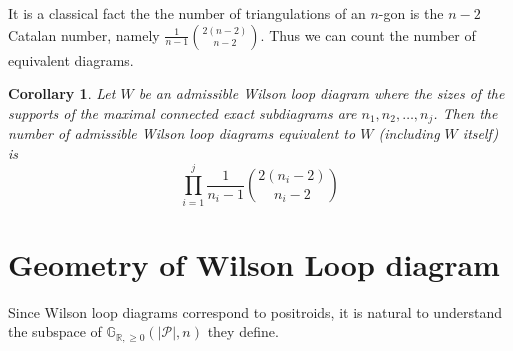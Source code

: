 \documentclass[11pt]{article}
\newcommand{\R}{\mathbb{R}}
\newcommand{\Gr}{\mathbb{G}_{\R, \geq 0}}
\newcommand{\cP}{\mathcal{P}}
\newtheorem{thm}{Theorem}[section]
\newtheorem{cor}[thm]{Corollary}
\theoremstyle{remark}
\theoremstyle{definition}
\newtheorem{dfn}[thm]{Definition}
\begin{document}
It is a classical fact the the number of triangulations of an $n$-gon is the $n-2$ Catalan number, namely $\frac{1}{n-1}\binom{2(n-2)}{n-2}$.  Thus we can count the number of equivalent diagrams.

\begin{cor}
  Let $W$ be an admissible Wilson loop diagram where the sizes of the supports of the maximal connected exact subdiagrams are $n_1, n_2, \ldots, n_j$.  Then the number of admissible Wilson loop diagrams equivalent to $W$ (including $W$ itself) is
  \[
  \prod_{i=1}^{j} \frac{1}{n_i-1}\binom{2(n_i-2)}{n_i-2}
  \]
\end{cor}

\section{Geometry of Wilson Loop diagram}
Since Wilson loop diagrams correspond to positroids, it is natural to understand the subspace of $\Gr(|\cP|, n)$ they define.
\end{document}
